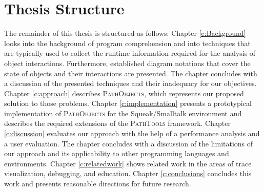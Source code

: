 \section{Thesis Structure}
The remainder of this thesis is structured as follows:
Chapter \ref{c:Background} looks into the background of program comprehension and into techniques that are typically used to collect the runtime information required for the analysis of object interactions.
Furthermore, established diagram notations that cover the state of objects and their interactions are presented.
The chapter concludes with a discussion of the presented techniques and their inadequacy for our objectives.
Chapter \ref{c:approach} describes \textsc{PathObjects}, which represents our proposed solution to those problems.
Chapter \ref{c:implementation} presents a prototypical implementation of \textsc{PathObjects} for the Squeak/Smalltalk environment and describes the required extensions of the \textsc{PathTools} framework.
Chapter \ref{c:discussion} evaluates our approach with the help of a performance analysis and a user evaluation. 
The chapter concludes with a discussion of the limitations of our approach and its applicability to other programming languages and environments.
Chapter \ref{c:relatedwork} shows related work in the areas of trace visualization, debugging, and education.
Chapter \ref{c:conclusions} concludes this work and presents reasonable directions for future research.